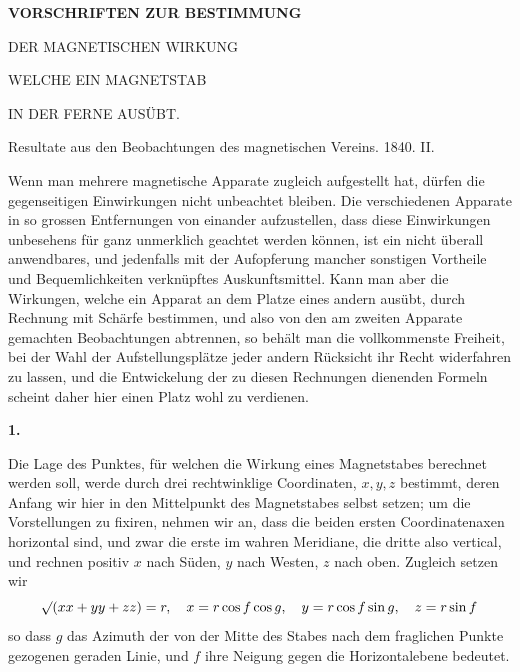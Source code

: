 \clearpage
{}
\begin{center}
{\Large\bfseries VORSCHRIFTEN ZUR BESTIMMUNG\par\medskip DER MAGNETISCHEN WIRKUNG\par\medskip WELCHE EIN MAGNETSTAB\par\medskip IN DER FERNE AUSÜBT.}
\par\bigskip
Resultate aus den Beobachtungen des magnetischen Vereins. 1840. II.
\end{center}
\renewcommand{\Article}[1]{\par\medskip\Needspace{4\baselineskip}\pdfbookmark[1]{#1.}{fernwirkung-art-#1}\centerline{\textbf{#1.}}\nobreak\smallskip}%
Wenn man mehrere magnetische Apparate zugleich aufgestellt hat, dürfen die gegenseitigen Einwirkungen nicht unbeachtet bleiben. Die verschiedenen Apparate in so grossen Entfernungen von einander aufzustellen, dass diese Einwirkungen unbesehens für ganz unmerklich geachtet werden können, ist ein nicht überall anwendbares, und jedenfalls mit der Aufopferung mancher sonstigen Vortheile und Bequemlichkeiten verknüpftes Auskunftsmittel. Kann man aber die Wirkungen, welche ein Apparat an dem Platze eines andern ausübt, durch Rechnung mit Schärfe bestimmen, und also von den am zweiten Apparate gemachten Beobachtungen abtrennen, so behält man die vollkommenste Freiheit, bei der Wahl der Aufstellungsplätze jeder andern Rücksicht ihr Recht widerfahren zu lassen, und die Entwickelung der zu diesen Rechnungen dienenden Formeln scheint daher hier einen Platz wohl zu verdienen.

\Article{1}
Die Lage des Punktes, für welchen die Wirkung eines Magnetstabes berechnet werden soll, werde durch drei rechtwinklige Coordinaten, $x,y,z$ bestimmt, deren Anfang wir hier in den Mittelpunkt des Magnetstabes selbst setzen; um die Vorstellungen zu fixiren, nehmen wir an, dass die beiden ersten Coordinatenaxen horizontal sind, und zwar die erste im wahren Meridiane, die dritte
also vertical, und rechnen positiv $x$ nach Süden, $y$ nach Westen, $z$ nach oben. Zugleich setzen wir
\[
\mathord{{}^{}\!\surd}(xx+yy+zz)=r,\quad x=r\cos f\cos g,\quad y=r\cos f\sin g,\quad z=r\sin f
\]
so dass $g$ das Azimuth der von der Mitte des Stabes nach dem fraglichen Punkte gezogenen geraden Linie, und $f$ ihre Neigung gegen die Horizontalebene bedeutet.

